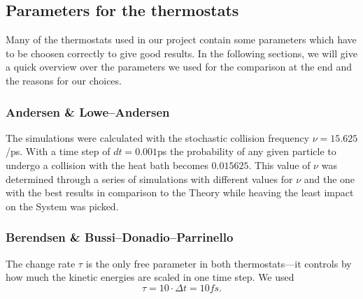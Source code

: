 % 
\graphicspath{{../graphics/}}

\subsection{Parameters for the thermostats}
Many of the thermostats used in our project contain some parameters which have to be choosen correctly to give good results. In the following sections, we will give a quick overview over the parameters we used for the comparison at the end and the reasons for our choices. 
\subsubsection{Andersen \& Lowe--Andersen}
The simulations were calculated with the stochastic collision frequency $\nu = 15.625$/ps. With a time step of $dt=0.001$ps the probability of any given particle to undergo a collision with the heat bath becomes $0.015625$. This value of $\nu$ was determined through a series of simulations with different values for $\nu$ and the one with the best results in comparison to the Theory while heaving the least impact on the System was picked.

\subsubsection{Berendsen \& Bussi--Donadio--Parrinello}
The change rate $\tau$ is the only free parameter in both thermostats---it controls by how much the kinetic energies are scaled in one time step. We used 
\begin{equation}
\tau = 10\cdot \Delta t = 10fs\text{.}
\end{equation}

